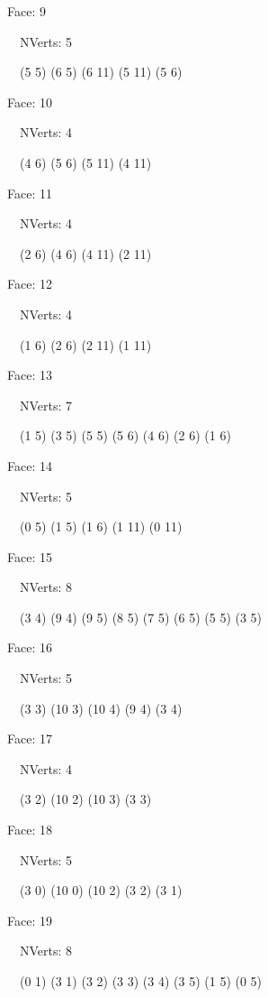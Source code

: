 \documentclass{article}
\begin{document}
{\footnotesize 

Face: 9

\   \    NVerts: 5

 \   \   (5 5) (6 5) (6 11) (5 11) (5 6)}

{\footnotesize 

Face: 10

\   \    NVerts: 4

 \   \   (4 6) (5 6) (5 11) (4 11)}

{\footnotesize 

Face: 11

\   \    NVerts: 4

 \   \   (2 6) (4 6) (4 11) (2 11)}

{\footnotesize 

Face: 12

\   \    NVerts: 4

 \   \   (1 6) (2 6) (2 11) (1 11)}

{\footnotesize 

Face: 13

\   \    NVerts: 7

 \   \   (1 5) (3 5) (5 5) (5 6) (4 6) (2 6) (1 6)}

{\footnotesize 

Face: 14

\   \    NVerts: 5

 \   \   (0 5) (1 5) (1 6) (1 11) (0 11)}

{\footnotesize 

Face: 15

\   \    NVerts: 8

 \   \   (3 4) (9 4) (9 5) (8 5) (7 5) (6 5) (5 5) (3 5)}

{\footnotesize 

Face: 16

\   \    NVerts: 5

 \   \   (3 3) (10 3) (10 4) (9 4) (3 4)}

{\footnotesize 

Face: 17

\   \    NVerts: 4

 \   \   (3 2) (10 2) (10 3) (3 3)}

{\footnotesize 

Face: 18

\   \    NVerts: 5

 \   \   (3 0) (10 0) (10 2) (3 2) (3 1)}

{\footnotesize 

Face: 19

\   \    NVerts: 8

 \   \   (0 1) (3 1) (3 2) (3 3) (3 4) (3 5) (1 5) (0 5)}
\end{document}
